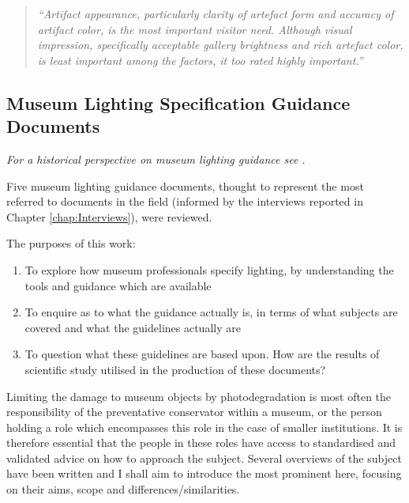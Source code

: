 \begin{quote}
\emph{``Artifact appearance, particularly clarity of artefact form and accuracy of artifact color, is the most important visitor need. Although visual impression, specifically acceptable gallery brightness and rich artefact color, is least important among the factors, it too rated highly important.''}~\citep{kesner_museum_1993-1}
\end{quote}



\subsection{Museum Lighting Specification Guidance Documents}

\textit{For a historical perspective on museum lighting guidance see \citet{druzik_museum_2007}.}

Five museum lighting guidance documents, thought to represent the most referred to documents in the field (informed by the interviews reported in Chapter \ref{chap:Interviews}), were reviewed. 

The purposes of this work:
\begin{enumerate}
\item To explore how museum professionals specify lighting, by understanding the tools and guidance which are available
\item To enquire as to what the guidance actually is, in terms of what subjects are covered and what the guidelines actually are
\item To question what these guidelines are based upon. How are the results of scientific study utilised in the production of these documents?
\end{enumerate}

Limiting the damage to museum objects by photodegradation is most often the responsibility of the preventative conservator within a museum, or the person holding a role which encompasses this role in the case of smaller institutions. It is therefore essential that the people in these roles have access to standardised and validated advice on how to approach the subject. Several overviews of the subject have been written and I shall aim to introduce the most prominent here, focusing on their aims, scope and differences/similarities. 

